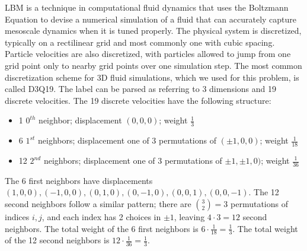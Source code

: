 \documentclass[11pt]{article} %
\begin{document}
LBM is a technique in computational fluid dynamics that uses the Boltzmann Equation
to devise a numerical simulation of a fluid that can accurately capture mesoscale dynamics
when it is tuned properly.
The physical system is discretized, typically on a rectilinear grid 
and most commonly one with cubic spacing.  
Particle velocities are also discretized, with particles allowed to jump 
from one grid point only to nearby grid points over one simulation step.
The most common discretization scheme for 3D fluid simulations,
which we used for this problem, is called D3Q19.
The label can be parsed as referring to 3 dimensions and 19 discrete velocities.
The 19 discrete velocities have the following structure:
\begin{itemize}
\item 1 $0^{th}$ neighbor; displacement $(0,0,0)$; weight $\frac{1}{3}$
\item 6 $1^{st}$ neighbors; displacement one of 3 permutations of $(\pm 1, 0, 0)$; weight $\frac{1}{18}$
\item 12 $2^{nd}$ neighbors; displacement one of 3 permutations of $\pm 1, \pm 1, 0)$; weight $\frac{1}{36}$
\end{itemize}
The 6 first neighbors have displacements $(1,0,0), (-1,0,0), (0,1,0), (0,-1,0), (0,0,1), (0,0,-1)$.
The 12 second neighbors follow a similar pattern; there are ${3 \choose 2} = 3$ permutations of indices
$i, j$, and each index has 2 choices in $\pm1$, leaving $4 \cdot 3 = 12$ second neighbors.
The total weight of the 6 first neighbors is $6 \cdot \frac{1}{18} = \frac{1}{3}$.
The total weight of the 12 second neighbors is $12 \cdot \frac{1}{36} = \frac{1}{3}$.
\end{document}
